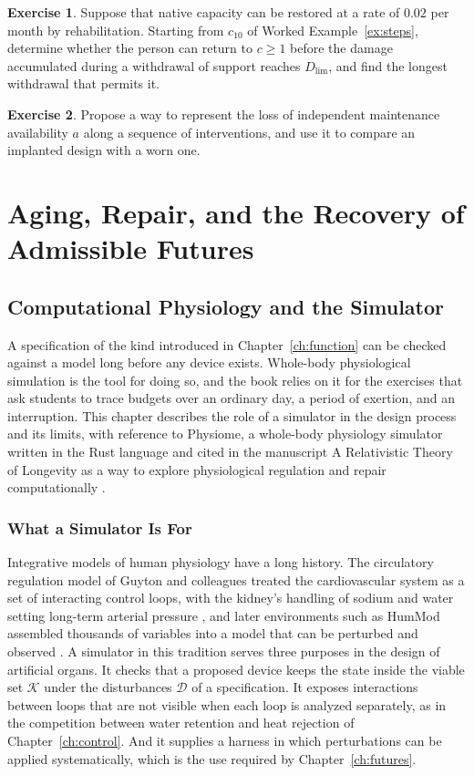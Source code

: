 \documentclass[11pt,openany]{book}
\theoremstyle{definition}
\newtheorem{exercise}{Exercise}[chapter]
\theoremstyle{remark}
\newcommand{\Kset}{\mathcal{K}}
\newcommand{\Dset}{\mathcal{D}}
\begin{document}
\begin{exercise}
Suppose that native capacity can be restored at a rate of $0.02$ per month by rehabilitation. Starting from $c_{10}$ of Worked Example~\ref{ex:steps}, determine whether the person can return to $c\ge1$ before the damage accumulated during a withdrawal of support reaches $D_{\lim}$, and find the longest withdrawal that permits it.
\end{exercise}

\begin{exercise}
Propose a way to represent the loss of independent maintenance availability $a$ along a sequence of interventions, and use it to compare an implanted design with a worn one.
\end{exercise}

\part{Aging, Repair, and the Recovery of Admissible Futures}

\chapter{Computational Physiology and the Simulator}
\label{ch:simulator}

A specification of the kind introduced in Chapter~\ref{ch:function} can be checked against a model long before any device exists. Whole-body physiological simulation is the tool for doing so, and the book relies on it for the exercises that ask students to trace budgets over an ordinary day, a period of exertion, and an interruption. This chapter describes the role of a simulator in the design process and its limits, with reference to Physiome, a whole-body physiology simulator written in the Rust language and cited in the manuscript A Relativistic Theory of Longevity as a way to explore physiological regulation and repair computationally \cite{flyxion2026physiome,flyxion2026rtl}.

\section{What a Simulator Is For}

Integrative models of human physiology have a long history. The circulatory regulation model of Guyton and colleagues treated the cardiovascular system as a set of interacting control loops, with the kidney's handling of sodium and water setting long-term arterial pressure \cite{guyton1972}, and later environments such as HumMod assembled thousands of variables into a model that can be perturbed and observed \cite{hester2011}. A simulator in this tradition serves three purposes in the design of artificial organs. It checks that a proposed device keeps the state inside the viable set $\Kset$ under the disturbances $\Dset$ of a specification. It exposes interactions between loops that are not visible when each loop is analyzed separately, as in the competition between water retention and heat rejection of Chapter~\ref{ch:control}. And it supplies a harness in which perturbations can be applied systematically, which is the use required by Chapter~\ref{ch:futures}.
\end{document}
